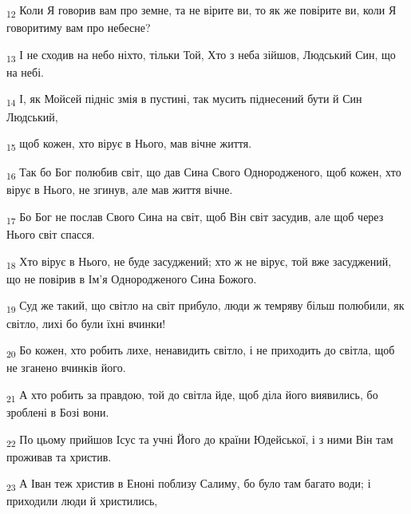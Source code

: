 \begin{tcolorbox}
\textsubscript{12} Коли Я говорив вам про земне, та не вірите ви, то як же повірите ви, коли Я говоритиму вам про небесне?
\end{tcolorbox}
\begin{tcolorbox}
\textsubscript{13} І не сходив на небо ніхто, тільки Той, Хто з неба зійшов, Людський Син, що на небі.
\end{tcolorbox}
\begin{tcolorbox}
\textsubscript{14} І, як Мойсей підніс змія в пустині, так мусить піднесений бути й Син Людський,
\end{tcolorbox}
\begin{tcolorbox}
\textsubscript{15} щоб кожен, хто вірує в Нього, мав вічне життя.
\end{tcolorbox}
\begin{tcolorbox}
\textsubscript{16} Так бо Бог полюбив світ, що дав Сина Свого Однородженого, щоб кожен, хто вірує в Нього, не згинув, але мав життя вічне.
\end{tcolorbox}
\begin{tcolorbox}
\textsubscript{17} Бо Бог не послав Свого Сина на світ, щоб Він світ засудив, але щоб через Нього світ спасся.
\end{tcolorbox}
\begin{tcolorbox}
\textsubscript{18} Хто вірує в Нього, не буде засуджений; хто ж не вірує, той вже засуджений, що не повірив в Ім'я Однородженого Сина Божого.
\end{tcolorbox}
\begin{tcolorbox}
\textsubscript{19} Суд же такий, що світло на світ прибуло, люди ж темряву більш полюбили, як світло, лихі бо були їхні вчинки!
\end{tcolorbox}
\begin{tcolorbox}
\textsubscript{20} Бо кожен, хто робить лихе, ненавидить світло, і не приходить до світла, щоб не зганено вчинків його.
\end{tcolorbox}
\begin{tcolorbox}
\textsubscript{21} А хто робить за правдою, той до світла йде, щоб діла його виявились, бо зроблені в Бозі вони.
\end{tcolorbox}
\begin{tcolorbox}
\textsubscript{22} По цьому прийшов Ісус та учні Його до країни Юдейської, і з ними Він там проживав та христив.
\end{tcolorbox}
\begin{tcolorbox}
\textsubscript{23} А Іван теж христив в Еноні поблизу Салиму, бо було там багато води; і приходили люди й христились,
\end{tcolorbox}
